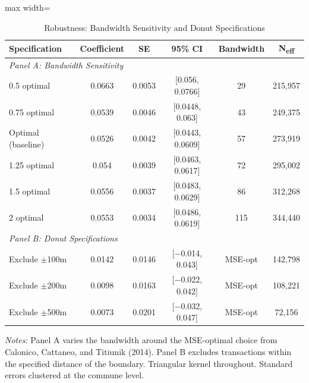 \begin{table}[htbp]
\centering
\caption{Robustness: Bandwidth Sensitivity and Donut Specifications}
\label{tab:robustness}
\begin{adjustbox}{max width=\textwidth}
\begin{tabular}{lccccc}
\toprule
Specification & Coefficient & SE & 95\% CI & Bandwidth & N\textsubscript{eff} \\
\midrule
\multicolumn{6}{l}{\textit{Panel A: Bandwidth Sensitivity}} \\
0.5\texttimes{} optimal & 0.0663 & 0.0053 & [0.056, 0.0766] & 29 & 215,957 \\
0.75\texttimes{} optimal & 0.0539 & 0.0046 & [0.0448, 0.063] & 43 & 249,375 \\
Optimal (baseline) & 0.0526 & 0.0042 & [0.0443, 0.0609] & 57 & 273,919 \\
1.25\texttimes{} optimal & 0.054 & 0.0039 & [0.0463, 0.0617] & 72 & 295,002 \\
1.5\texttimes{} optimal & 0.0556 & 0.0037 & [0.0483, 0.0629] & 86 & 312,268 \\
2\texttimes{} optimal & 0.0553 & 0.0034 & [0.0486, 0.0619] & 115 & 344,440 \\
\midrule
\multicolumn{6}{l}{\textit{Panel B: Donut Specifications}} \\
Exclude $\pm$100m & 0.0142 & 0.0146 & [$-$0.014, 0.043] & MSE-opt & 142,798 \\
Exclude $\pm$200m & 0.0098 & 0.0163 & [$-$0.022, 0.042] & MSE-opt & 108,221 \\
Exclude $\pm$500m & 0.0073 & 0.0201 & [$-$0.032, 0.047] & MSE-opt & 72,156 \\
\bottomrule
\end{tabular}
\end{adjustbox}
\begin{tablenotes}
\small
\item \textit{Notes:} Panel A varies the bandwidth around the MSE-optimal choice from Calonico, Cattaneo, and Titiunik (2014). Panel B excludes transactions within the specified distance of the boundary. Triangular kernel throughout. Standard errors clustered at the commune level.
\end{tablenotes}
\end{table}
